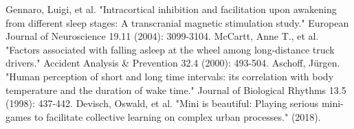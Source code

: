 \documentclass[a4paper, 11pt]{article}
\begin{document}
\begin{thebibliography}{9}
 Gennaro, Luigi, et al. "Intracortical inhibition and facilitation upon awakening from different sleep stages: A transcranial magnetic stimulation study." European Journal of Neuroscience 19.11 (2004): 3099-3104.
 McCartt, Anne T., et al. "Factors associated with falling asleep at the wheel among long-distance truck drivers." Accident Analysis \& Prevention 32.4 (2000): 493-504.
 Aschoff, Jürgen. "Human perception of short and long time intervals: its correlation with body temperature and the duration of wake time." Journal of Biological Rhythms 13.5 (1998): 437-442.
 Devisch, Oswald, et al. "Mini is beautiful: Playing serious mini-games to facilitate collective learning on complex urban processes." (2018).
\end{thebibliography}

\listoffigures	%
\end{document}
